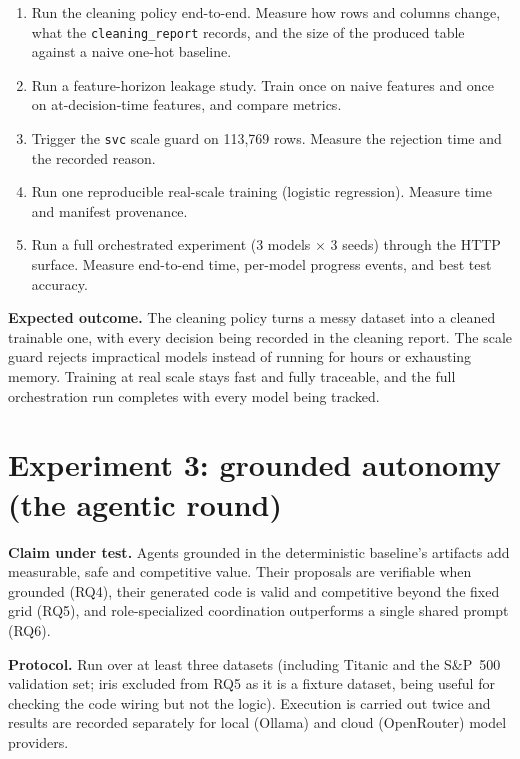 \begin{enumerate}
	\item Run the cleaning policy end-to-end. Measure how rows and columns change, what the \texttt{cleaning\_report} records, and the size of the produced table against a naive one-hot baseline.
	\item Run a feature-horizon leakage study. Train once on naive features and once on at-decision-time features, and compare metrics.
	\item Trigger the \texttt{svc} scale guard on 113{,}769 rows. Measure the rejection time and the recorded reason.
	\item Run one reproducible real-scale training (logistic regression). Measure time and manifest provenance.
	\item Run a full orchestrated experiment (3 models $\times$ 3 seeds) through the HTTP surface. Measure end-to-end time, per-model progress events, and best test accuracy.
\end{enumerate}

\textbf{Expected outcome.} The cleaning policy turns a messy dataset into a cleaned trainable one, with every decision being recorded in the cleaning report. The scale guard rejects impractical models instead of running for hours or exhausting memory. Training at real scale stays fast and fully traceable, and the full orchestration run completes with every model being tracked.


\section{Experiment 3: grounded autonomy (the agentic round)}
\label{sec:exp-agentic}

\textbf{Claim under test.} Agents grounded in the deterministic baseline's artifacts add measurable, safe and competitive value. Their proposals are verifiable when grounded (RQ4), their generated code is valid and competitive beyond the fixed grid (RQ5), and role-specialized coordination outperforms a single shared prompt (RQ6).

\textbf{Protocol.} Run over at least three datasets (including Titanic and the S\&P~500 validation set; iris excluded from RQ5 as it is a fixture dataset, being useful for checking the code wiring but not the logic). Execution is carried out twice and results are recorded separately for local (Ollama) and cloud (OpenRouter) model providers.


